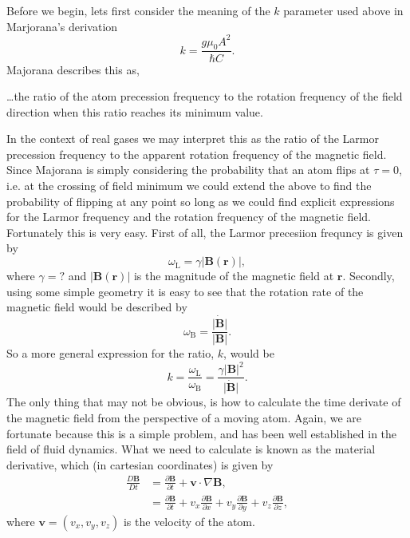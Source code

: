 Before we begin, lets first consider the meaning of the $k$ parameter used above in Marjorana's derivation
\begin{equation}
    k = \frac{g \mu_{0} A^2} {\hbar C}.
\end{equation}
Majorana describes this as, 
\begin{displayquote}
    \dots the ratio of the atom precession frequency to the rotation frequency of the field direction when this ratio reaches its minimum value.
\end{displayquote}
In the context of real gases we may interpret this as the ratio of the Larmor precession frequency to the apparent rotation frequency of the magnetic field.
Since Majorana is simply considering the probability that an atom flips at $\tau = 0$, i.e. at the crossing of field minimum we could extend the above to find the probability of flipping at any point so long as we could find explicit expressions for the Larmor frequency and the rotation frequency of the magnetic field.
Fortunately this is very easy.
First of all, the Larmor precesiion frequncy is given by
\begin{equation}
    \omega_{\textrm{L}} = \gamma \vert \mathbf{B}(\mathbf{r}) \vert,
\end{equation}
where $\gamma = ?$ and $\vert \mathbf{B}(\mathbf{r}) \vert$ is the magnitude of the magnetic field at $\mathbf{r}$.
Secondly, using some simple geometry it is easy to see that the rotation rate of the magnetic field would be described by
\begin{equation}
    \omega_\mathrm{B} = \frac{\dot{ \left\vert \mathbf{B} \right \vert } } { \left \vert \mathbf{B} \right \vert}.
\end{equation}
So a more general expression for the ratio, $k$, would be
\begin{equation}
    k = \frac{\omega_\textrm{L}}{\omega_\textrm{B}} = \frac{\gamma \left\vert \mathbf{B} \right\vert^2}{\dot{ \left\vert \mathbf{B} \right \vert } }.
\end{equation}
The only thing that may not be obvious, is how to calculate the time derivate of the magnetic field from the perspective of a moving atom.
Again, we are fortunate because this is a simple problem, and has been well established in the field of fluid dynamics.
What we need to calculate is known as the material derivative, which (in cartesian coordinates) is given by
\begin{align}
    \frac{D \mathbf{B}}{Dt} &= \frac{\partial \mathbf{B}}{\partial t} + \mathbf{v} \cdot \nabla \mathbf{B},\\
    &= \frac{\partial \mathbf{B}}{\partial t} + v_x  \frac{\partial \mathbf{B}}{\partial x} + v_y \frac{\partial \mathbf{B}}{\partial y} + v_z \frac{\partial \mathbf{B}}{\partial z},
\end{align}
where $\mathbf{v} = \left(v_x,v_y,v_z\right)$ is the velocity of the atom.





